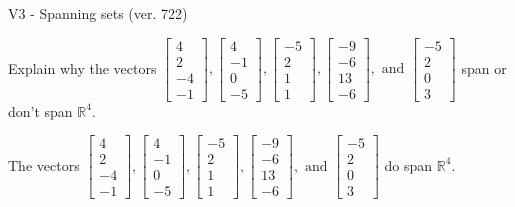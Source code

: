 \begin{exercise}
  \begin{exerciseTitle}V3 - Spanning sets (ver. 722)\end{exerciseTitle}
  \begin{exerciseStatement}
    Explain why the vectors \(\left[\begin{array}{r}
4 \\
2 \\
-4 \\
-1
\end{array}\right] , \left[\begin{array}{r}
4 \\
-1 \\
0 \\
-5
\end{array}\right] , \left[\begin{array}{r}
-5 \\
2 \\
1 \\
1
\end{array}\right] , \left[\begin{array}{r}
-9 \\
-6 \\
13 \\
-6
\end{array}\right] , \text{ and } \left[\begin{array}{r}
-5 \\
2 \\
0 \\
3
\end{array}\right]\) span or don't span \(\mathbb{R}^4\). 
	


  \end{exerciseStatement}
  \begin{exerciseAnswer}
   The vectors \(\left[\begin{array}{r}
4 \\
2 \\
-4 \\
-1
\end{array}\right] , \left[\begin{array}{r}
4 \\
-1 \\
0 \\
-5
\end{array}\right] , \left[\begin{array}{r}
-5 \\
2 \\
1 \\
1
\end{array}\right] , \left[\begin{array}{r}
-9 \\
-6 \\
13 \\
-6
\end{array}\right] , \text{ and } \left[\begin{array}{r}
-5 \\
2 \\
0 \\
3
\end{array}\right]\) 
  	 do  
	span \(\mathbb{R}^4\).
  



\end{exerciseAnswer}
\end{exercise}
